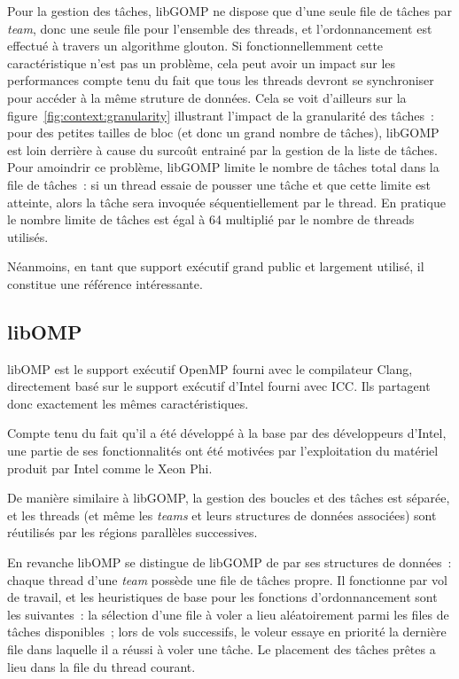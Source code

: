 Pour la gestion des tâches, libGOMP ne dispose que d'une seule file de tâches par \emph{team}, donc une seule file pour l'ensemble des threads, et l'ordonnancement est effectué à travers un algorithme glouton.
Si fonctionnellemment cette caractéristique n'est pas un problème, cela peut avoir un impact sur les performances compte tenu du fait que tous les threads devront se synchroniser pour accéder à la même struture de données.
Cela se voit d'ailleurs sur la figure~\ref{fig:context:granularity} illustrant l'impact de la granularité des tâches~: pour des petites tailles de bloc (et donc un grand nombre de tâches), libGOMP est loin derrière à cause du surcoût entrainé par la gestion de la liste de tâches.
Pour amoindrir ce problème, libGOMP limite le nombre de tâches total dans la file de tâches~: si un thread essaie de pousser une tâche et que cette limite est atteinte, alors la tâche sera invoquée séquentiellement par le thread.
En pratique le nombre limite de tâches est égal à 64 multiplié par le nombre de threads utilisés.

Néanmoins, en tant que support exécutif grand public et largement utilisé, il constitue une référence intéressante.

\subsection{libOMP}

libOMP est le support exécutif OpenMP fourni avec le compilateur Clang, directement basé sur le support exécutif d'Intel fourni avec ICC.
Ils partagent donc exactement les mêmes caractéristiques.

Compte tenu du fait qu'il a été développé à la base par des développeurs d'Intel, une partie de ses fonctionnalités ont été motivées par l'exploitation du matériel produit par Intel comme le Xeon Phi.

De manière similaire à libGOMP, la gestion des boucles et des tâches est séparée, et les threads (et même les \emph{teams} et leurs structures de données associées) sont réutilisés par les régions parallèles successives.

En revanche libOMP se distingue de libGOMP de par ses structures de données~: chaque thread d'une \emph{team} possède une file de tâches propre.
Il fonctionne par vol de travail, et les heuristiques de base pour les fonctions d'ordonnancement sont les suivantes~:
la sélection d'une file à voler a lieu aléatoirement parmi les files de tâches disponibles~;
lors de vols successifs, le voleur essaye en priorité la dernière file dans laquelle il a réussi à voler une tâche.
Le placement des tâches prêtes a lieu dans la file du thread courant.

